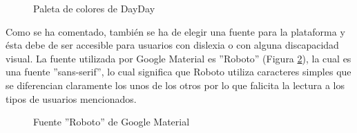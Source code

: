 \begin{figure}[H]
    \caption{Paleta de colores de DayDay}
    \label{paleta}
\end{figure}

Como se ha comentado, también se ha de elegir una fuente para la plataforma y ésta debe de ser accesible para usuarios con dislexia o con alguna discapacidad visual. La fuente utilizada por Google Material es ''Roboto'' (Figura \ref{roboto}), la cual es una fuente ''sans-serif'', lo cual significa que Roboto utiliza caracteres simples que se diferencian claramente los unos de los otros por lo que falicita la lectura a los tipos de usuarios mencionados.

\begin{figure}[H]
    \caption{Fuente ''Roboto'' de Google Material}
    \label{roboto}
\end{figure}

